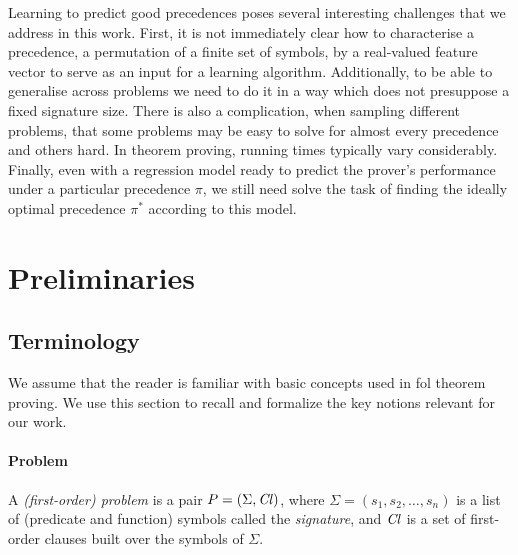 Learning to predict good precedences poses several interesting challenges that we address in this work.
First, it is not immediately clear how to characterise a precedence, a permutation of a finite set of symbols,
by a real-valued feature vector to serve as an input for a learning algorithm. 
Additionally, to be able to generalise across problems
we need to do it in a way which does not presuppose a fixed signature size. 
There is also a complication, when sampling different problems,
that some problems may be easy to solve for almost every precedence and others hard.
In theorem proving, running times typically vary considerably.
Finally, even with a regression model ready to predict the prover's performance 
under a particular precedence $\pi$, we still need solve the task of finding 
the ideally optimal precedence $\pi^*$ according to this model.


\newpage

\section{Preliminaries}

\subsection{Terminology}

We assume that the reader is familiar with basic concepts used in \gls{fol} theorem proving.
We use this section to recall and formalize the key notions relevant for our work.



\paragraph{Problem}
A \emph{(first-order) problem} is a pair \(P = (\Sigma, \operatorname{\mathit{Cl}})\),
where \(\Sigma = (s_1, s_2, \ldots, s_n)\) is a list of (predicate and function) symbols called the \emph{signature},
and \(\operatorname{\mathit{Cl}}\) is a set of first-order
clauses built over the symbols of \(\Sigma\).

